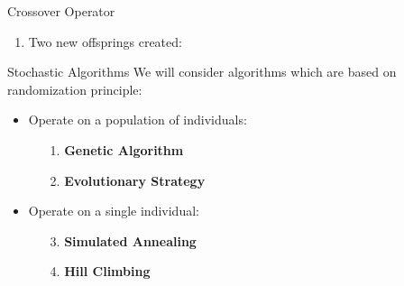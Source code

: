 \documentclass{beamer}
\begin{document}
\begin{frame}[t]{Crossover Operator}
\begin{enumerate}
        \item Two new offsprings created:\par
            \begin{minipage}[t]{\linewidth}
                \centering
            \end{minipage}
    \end{enumerate}
\end{frame}

\begin{frame}[t]{Stochastic Algorithms}
    We will consider algorithms which are based on randomization principle:
    \vspace{10px}
\begin{itemize}\itemsep1.5em
        \item Operate on a population of individuals:
        \begin{itemize}\itemsep1.5em
                    \vspace*{1em}
                \item[1.] \textbf{Genetic Algorithm}
                \item[2.] \textbf{Evolutionary Strategy}
            \end{itemize}
        \item Operate on a single individual:
        \begin{itemize}\itemsep1.5em
                    \vspace*{1em}
                \item[3.] \textbf{Simulated Annealing }
                \item[4.] \textbf{Hill Climbing }
    \end{itemize}
    \end{itemize}
\end{frame}
\end{document}
